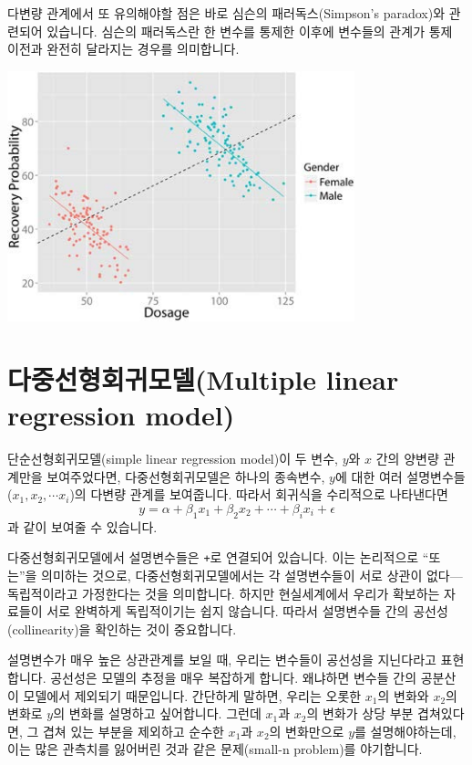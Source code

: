 \documentclass[]{book}
\begin{document}
다변량 관계에서 또 유의해야할 점은 바로 심슨의 패러독스(Simpson's paradox)와 관련되어 있습니다. 심슨의 패러독스란 한 변수를 통제한 이후에 변수들의 관계가 통제 이전과 완전히 달라지는 경우를 의미합니다.

\begin{center}\includegraphics[width=3.97in]{./Chapters_pdfR/plot/simpson} \end{center}

\hypertarget{uxb2e4uxc911uxc120uxd615uxd68cuxadc0uxbaa8uxb378multiple-linear-regression-model}{%
\section{다중선형회귀모델(Multiple linear regression model)}\label{uxb2e4uxc911uxc120uxd615uxd68cuxadc0uxbaa8uxb378multiple-linear-regression-model}}

단순선형회귀모델(simple linear regression model)이 두 변수, \(y\)와 \(x\) 간의 양변량 관계만을 보여주었다면, 다중선형회귀모델은 하나의 종속변수, \(y\)에 대한 여러 설명변수들(\(x_1, x_2, \cdots x_i\))의 다변량 관계를 보여줍니다. 따라서 회귀식을 수리적으로 나타낸다면 \[y = \alpha + \beta_1x_1 + \beta_2x_2 + \cdots + \beta_ix_i + \epsilon\]과 같이 보여줄 수 있습니다.

다중선형회귀모델에서 설명변수들은 \texttt{+}로 연결되어 있습니다. 이는 논리적으로 ``또는''을 의미하는 것으로, 다중선형회귀모델에서는 각 설명변수들이 서로 상관이 없다---독립적이라고 가정한다는 것을 의미합니다. 하지만 현실세계에서 우리가 확보하는 자료들이 서로 완벽하게 독립적이기는 쉽지 않습니다. 따라서 설명변수들 간의 공선성(collinearity)을 확인하는 것이 중요합니다.

설명변수가 매우 높은 상관관계를 보일 때, 우리는 변수들이 공선성을 지닌다라고 표현합니다. 공선성은 모델의 추정을 매우 복잡하게 합니다. 왜냐하면 변수들 간의 공분산이 모델에서 제외되기 때문입니다. 간단하게 말하면, 우리는 오롯한 \(x_1\)의 변화와 \(x_2\)의 변화로 \(y\)의 변화를 설명하고 싶어합니다. 그런데 \(x_1\)과 \(x_2\)의 변화가 상당 부분 겹쳐있다면, 그 겹쳐 있는 부분을 제외하고 순수한 \(x_1\)과 \(x_2\)의 변화만으로 \(y\)를 설명해야하는데, 이는 많은 관측치를 잃어버린 것과 같은 문제(small-n problem)를 야기합니다.
\end{document}
